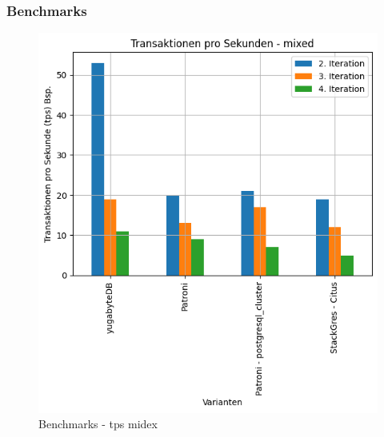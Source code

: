 
\begin{flushleft}
    \subsubsection{Benchmarks}
    \begin{figure}[H]
        \centering
        \includegraphics[width=1\linewidth]{source/pandas_data_chart_plotter/tps_mixed}
        \caption{Benchmarks - tps midex}
        \label{fig:tps_mixed}
    \end{figure}
\end{flushleft}
